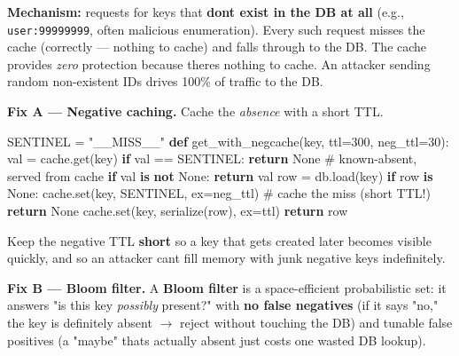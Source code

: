 \documentclass[11pt]{article}
\newenvironment{Shaded}{\begin{snugshade}}{\end{snugshade}}
\newcommand{\BuiltInTok}[1]{\textcolor[rgb]{0.50,0.55,0.55}{#1}}
\newcommand{\CommentTok}[1]{\textcolor[rgb]{0.48,0.49,0.49}{#1}}
\newcommand{\ControlFlowTok}[1]{\textcolor[rgb]{0.99,0.74,0.29}{\textbf{#1}}}
\newcommand{\DecValTok}[1]{\textcolor[rgb]{0.96,0.45,0.00}{#1}}
\newcommand{\KeywordTok}[1]{\textcolor[rgb]{0.81,0.81,0.76}{\textbf{#1}}}
\newcommand{\NormalTok}[1]{\textcolor[rgb]{0.81,0.81,0.76}{#1}}
\newcommand{\OperatorTok}[1]{\textcolor[rgb]{0.81,0.81,0.76}{#1}}
\newcommand{\StringTok}[1]{\textcolor[rgb]{0.96,0.31,0.31}{#1}}
\newcommand{\VariableTok}[1]{\textcolor[rgb]{0.15,0.68,0.68}{#1}}
\begin{document}
\textbf{Mechanism:} requests for keys that \textbf{don\textquotesingle t exist in the DB at all} (e.g., \texttt{user:99999999}, often malicious enumeration). Every such request misses the cache (correctly --- nothing to cache) and falls through to the DB. The cache provides \emph{zero} protection because there\textquotesingle s nothing to cache. An attacker sending random non-existent IDs drives 100\% of traffic to the DB.

\textbf{Fix A --- Negative caching.} Cache the \emph{absence} with a short TTL.


\begin{Shaded}
\begin{Highlighting}[]
\NormalTok{SENTINEL }\OperatorTok{=} \StringTok{"\_\_MISS\_\_"}
\KeywordTok{def}\NormalTok{ get\_with\_negcache(key, ttl}\OperatorTok{=}\DecValTok{300}\NormalTok{, neg\_ttl}\OperatorTok{=}\DecValTok{30}\NormalTok{):}
\NormalTok{    val }\OperatorTok{=}\NormalTok{ cache.get(key)}
    \ControlFlowTok{if}\NormalTok{ val }\OperatorTok{==}\NormalTok{ SENTINEL:}
        \ControlFlowTok{return} \VariableTok{None}                       \CommentTok{\# known{-}absent, served from cache}
    \ControlFlowTok{if}\NormalTok{ val }\KeywordTok{is} \KeywordTok{not} \VariableTok{None}\NormalTok{:}
        \ControlFlowTok{return}\NormalTok{ val}
\NormalTok{    row }\OperatorTok{=}\NormalTok{ db.load(key)}
    \ControlFlowTok{if}\NormalTok{ row }\KeywordTok{is} \VariableTok{None}\NormalTok{:}
\NormalTok{        cache.}\BuiltInTok{set}\NormalTok{(key, SENTINEL, ex}\OperatorTok{=}\NormalTok{neg\_ttl)   }\CommentTok{\# cache the miss (short TTL!)}
        \ControlFlowTok{return} \VariableTok{None}
\NormalTok{    cache.}\BuiltInTok{set}\NormalTok{(key, serialize(row), ex}\OperatorTok{=}\NormalTok{ttl)}
    \ControlFlowTok{return}\NormalTok{ row}
\end{Highlighting}
\end{Shaded}

Keep the negative TTL \textbf{short} so a key that gets created later becomes visible quickly, and so an attacker can\textquotesingle t fill memory with junk negative keys indefinitely.

\textbf{Fix B --- Bloom filter.} A \textbf{Bloom filter} is a space-efficient probabilistic set: it answers "is this key \emph{possibly} present?" with \textbf{no false negatives} (if it says "no," the key is definitely absent \(\rightarrow\) reject without touching the DB) and tunable false positives (a "maybe" that\textquotesingle s actually absent just costs one wasted DB lookup).
\end{document}
